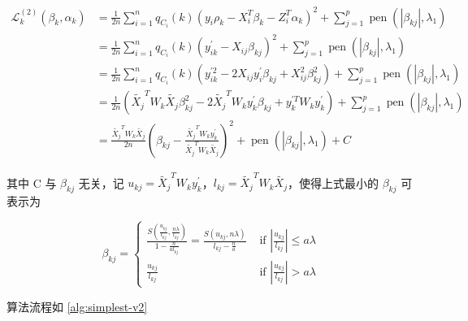 \documentclass[12pt, a4paper, oneside]{article}
\numberwithin{equation}{section}
\begin{document}
\begin{equation}
	\begin{aligned}
		\mathcal{L}^{(2)}_k (\beta_k, \alpha_k) &= \frac{1}{2n}\sum_{i=1}^{n} q_{C_i}(k)\left(y_i\rho_k - X_i^T \beta_k - Z_i^T \alpha_k \right)^2 + \sum_{j=1}^{p} \operatorname{pen}\left(|\beta_{kj}|, \lambda_{1}\right) \\
		&= \frac{1}{2n}\sum_{i=1}^{n} q_{C_i}(k)\left(y_{ik}^\prime - X_{ij} \beta_{kj} \right)^2 + \sum_{j=1}^{p} \operatorname{pen}\left(|\beta_{kj}|, \lambda_{1}\right) \\
		&=  \frac{1}{2n}\sum_{i=1}^{n} q_{C_i}(k)\left(y_{ik}^{\prime 2} - 2X_{ij} y_i^{\prime}\beta_{kj} + X_{ij}^2 \beta_{kj}^2\right) + \sum_{j=1}^{p} \operatorname{pen}\left(|\beta_{kj}|, \lambda_{1}\right) \\
		&= \frac{1}{2n}\left( \tilde{X_j}^T W_k \tilde{X_j} \beta_{kj}^2 - 2\tilde{X_j}^TW_k y_k^\prime \beta_{kj} + y_k^{\prime T}W_ky_k^\prime \right) + \sum_{j=1}^{p} \operatorname{pen}\left(|\beta_{kj}|, \lambda_{1}\right) \\
		&= \frac{\tilde{X_j}^T W_k \tilde{X_j}}{2n}\left( \beta_{kj}-\frac{\tilde{X_j}^TW_k y_k^\prime}{\tilde{X_j}^T W_k \tilde{X_j}} \right)^2 + \operatorname{pen}\left(|\beta_{kj}|, \lambda_{1}\right) + C
	\end{aligned}
\label{eq:v2-object-k}
\end{equation}

其中 C 与 $\beta_{kj}$ 无关，记 $u_{kj} = \tilde{X_j}^TW_k y_k^\prime$，$l_{kj} = \tilde{X_j}^T W_k \tilde{X_j}$，使得上式最小的 $\beta_{kj}$ 可表示为

\begin{equation}
	\beta_{kj} = 
	\begin{cases}
	\frac{S\left(\frac{u_{kj}}{l_{kj}}, \frac{n\lambda}{l_{kj}}\right)}{1-\frac{n}{al_{kj}}} = 
	\frac{S\left(u_{kj}, n\lambda\right)}{l_{kj}-\frac{n}{a}} & \text { if }|\frac{u_{kj}}{l_{kj}}| \leq a \lambda \\ 
	\frac{u_{kj}}{l_{kj}} & \text { if }|\frac{u_{kj}}{l_{kj}}|>a \lambda
\end{cases}
\end{equation}

算法流程如 \ref{alg:simplest-v2}
\end{document}
